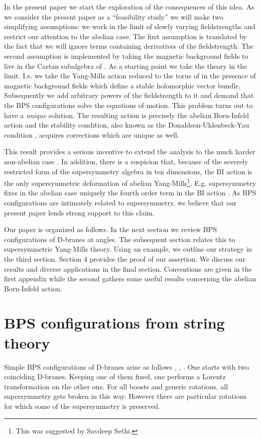 \documentclass[a4paper,12pt,oneside]{article}
\begin{document}
In the present paper we start the exploration of the consequences of this
idea. As we consider the present paper as a ``feasibility study'' we will
make two simplifying assumptions: we work in the limit of slowly varying
fieldstrengths and restrict our attention to the abelian case. The first
assumption is translated by the fact that we will ignore terms containing
derivatives of the fieldstrength. The second assumption is implemented by
taking the magnetic background fields to live in the Cartan subalgebra of
\coordHE{}. As a starting point we take the theory in the \coordHE{} limit. I.e. we take the Yang-Mills action reduced to the
torus of \coordHE{} in the presence of magnetic background fields which
define a stable holomorphic vector bundle. Subsequently we add arbitrary
powers of the fieldstrength to it and demand that the BPS configurations
solve the equations of motion. This problem turns out to have a {\em
unique} solution. The resulting action is precisely the abelian
Born-Infeld action and the stability condition, also known as the
Donaldson-Uhlenbeck-Yau condition \cite{DUY}, acquires \coordHE{}
corrections which are unique as well.

This result provides a serious incentive to extend the analysis to the
much harder non-abelian case \cite{wij}. In addition, there is a
suspicion that, because of the severely restricted form of the
supersymmetry algebra in ten dimensions, the BI action is the only
supersymmetric deformation of abelian Yang-Mills\footnote{This was
suggested by Savdeep Sethi.}. E.g. supersymmetry fixes in the abelian
case uniquely the fourth order term in the BI action \cite{BMT}. As BPS
configurations are intimately related to supersymmetry, we believe that our
present paper lends strong support to this claim.

Our paper is organized as follows. In the next section we review BPS
configurations of D\coordHE{}-branes at angles. The subsequent section relates
this to supersymmetric Yang-Mills theory. Using an example, we outline
our strategy in the third section. Section 4 provides the proof of our
assertion. We discuss our results and diverse applications in the final
section. Conventions are given in the first appendix while the second
gathers some useful results concerning the abelian Born-Infeld action.

\setcounter{equation}{0}
\section{BPS configurations from string theory}
Simple BPS configurations of D-branes arise as follows \cite{Angles1}, 
\cite{Angles2}, \cite{townsend}. 
One starts with two coinciding D\coordHE{}-branes. Keeping one of them fixed, 
one performs a Lorentz transformation on the other one.
For all boosts and generic rotations, 
all supersymmetry gets broken in this way. 
However there are particular rotations for 
which some of the supersymmetry is preserved. 
\end{document}
